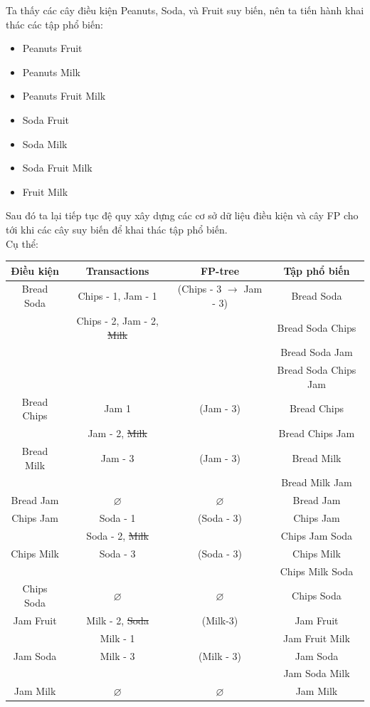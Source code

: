 \documentclass{article}
\begin{document}
\begin{flushleft}
Ta thấy các cây điều kiện Peanuts, Soda, và Fruit suy biến, nên ta tiến hành khai thác các tập phổ biến:
\begin{itemize}
	\item Peanuts Fruit
	\item Peanuts Milk
	\item Peanuts Fruit Milk
	\item Soda Fruit
	\item Soda Milk
	\item Soda Fruit Milk
	\item Fruit Milk
\end{itemize}
Sau đó ta lại tiếp tục đệ quy xây dựng các cơ sở dữ liệu điều kiện và cây FP cho tới khi các cây suy biến để khai thác tập phổ biến.\\
Cụ thể:\\
\begin{tabular}{|c|c|c|c|}
	\hline
	Điều kiện & Transactions & FP-tree & Tập phổ biến \\ 
	\hline
	Bread Soda & Chips - 1, Jam - 1 & (Chips - 3 $\to$ Jam - 3) & Bread Soda \\ 
	& Chips - 2, Jam - 2, \st{Milk} &  & Bread Soda Chips \\ 
	&  &  &  Bread Soda Jam\\
	&  &  &  Bread Soda Chips Jam\\ 
	\hline
	Bread Chips & Jam 1 & (Jam - 3) &Bread Chips\\
	& Jam - 2, \st{Milk} &  & Bread Chips Jam\\
	\hline
	Bread Milk & Jam - 3 & (Jam - 3)& Bread Milk\\
	&  &  &  Bread Milk Jam\\
	\hline
	Bread Jam & $\varnothing$ & $\varnothing$ &Bread Jam\\   
	\hline
	Chips Jam & Soda - 1 & (Soda - 3) & Chips Jam\\
	& Soda - 2, \st{Milk} &  & Chips Jam Soda\\
	\hline
	Chips Milk & Soda - 3 & (Soda - 3) & Chips Milk\\
	&  &  & Chips Milk Soda\\
	\hline
	Chips Soda & $\varnothing$ & $\varnothing$ & Chips Soda\\
	\hline
	Jam Fruit & Milk - 2, \st{Soda} & (Milk-3) & Jam Fruit\\
	& Milk - 1 &  & Jam Fruit Milk\\
	\hline
	Jam Soda & Milk - 3 & (Milk - 3) & Jam Soda \\
	&  &  & Jam Soda Milk\\
	\hline 
	Jam Milk & $\varnothing$ & $\varnothing$ & Jam Milk\\
	\hline
\end{tabular} 

\end{flushleft}
\end{document}
